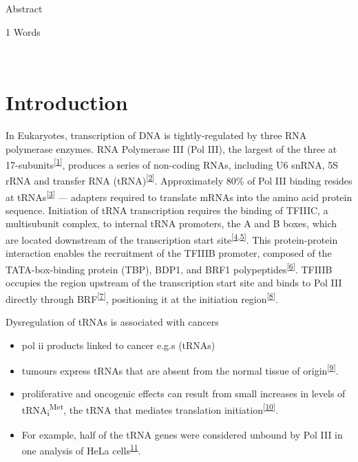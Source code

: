 \documentclass[
  12pt,
]{article}
\begin{document}
Abstract

\normalsize
\begin{flushright}
1 Words
\end{flushright}
\hrulefill\\
\setlength{\parindent}{10pt}

\hypertarget{introduction}{%
\section{Introduction}\label{introduction}}

In Eukaryotes, transcription of DNA is tightly-regulated by three RNA polymerase enzymes.
RNA Polymerase III (Pol III), the largest of the three at 17-subunits\textsuperscript{{[}\protect\hyperlink{ref-vannini2012}{1}{]}}, produces a series of non-coding RNAs, including U6 snRNA, 5S rRNA and transfer RNA (tRNA)\textsuperscript{{[}\protect\hyperlink{ref-dieci2007}{2}{]}}.
Approximately 80\% of Pol III binding resides at tRNAs\textsuperscript{{[}\protect\hyperlink{ref-Raha2010a}{3}{]}} --- adapters required to translate mRNAs into the amino acid protein sequence.
Initiation of tRNA transcription requires the binding of TFIIIC, a multisubunit complex, to internal tRNA promoters, the A and B boxes, which are located downstream of the transcription start site\textsuperscript{{[}\protect\hyperlink{ref-Schramm2002}{4},\protect\hyperlink{ref-Lassar1983}{5}{]}}.
This protein-protein interaction enables the recruitment of the TFIIIB promoter, composed of the TATA-box-binding protein (TBP), BDP1, and BRF1 polypeptides\textsuperscript{{[}\protect\hyperlink{ref-schramm2000}{6}{]}}.
TFIIIB occupies the region upstream of the transcription start site and binds to Pol III directly through BRF\textsuperscript{{[}\protect\hyperlink{ref-Khoo1994}{7}{]}}, positioning it at the initiation region\textsuperscript{{[}\protect\hyperlink{ref-kassavetis1990}{8}{]}}.

Dysregulation of tRNAs is associated with cancers

\begin{itemize}
\item
  pol ii products linked to cancer e.g.s (tRNAs)
\item
  tumours express tRNAs that are absent from the normal tissue of origin\textsuperscript{{[}\protect\hyperlink{ref-kuchino1978}{9}{]}}.
\item
  proliferative and oncogenic effects can result from small increases in levels of tRNA\textsubscript{i}\textsuperscript{Met}, the tRNA that mediates translation initiation\textsuperscript{{[}\protect\hyperlink{ref-marshall2008}{10}{]}}.
\item
  For example, half of the tRNA genes were considered unbound by Pol III in one analysis of HeLa cells\textsuperscript{\href{https://www.nature.com/articles/nrg3001\#ref-CR11}{11}}.
\end{itemize}
\end{document}
